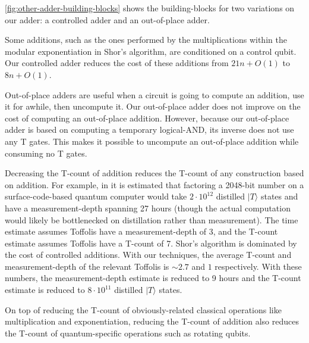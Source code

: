 \documentclass[twocolumn]{quantumarticle-customized}
\begin{document}
\autoref{fig:other-adder-building-blocks} shows the building-blocks for two variations on our adder: a controlled adder and an out-of-place adder.

Some additions, such as the ones performed by the multiplications within the modular exponentiation in Shor's algorithm, are conditioned on a control qubit.
Our controlled adder reduces the cost of these additions from $21n + O(1)$ \cite{Coreas2017} to $8n + O(1)$.

Out-of-place adders are useful when a circuit is going to compute an addition, use it for awhile, then uncompute it.
Our out-of-place adder does not improve on the cost of computing an out-of-place addition.
However, because our out-of-place adder is based on computing a temporary logical-AND, its inverse does not use any T gates.
This makes it possible to uncompute an out-of-place addition while consuming no T gates.

Decreasing the T-count of addition reduces the T-count of any construction based on addition.
For example, in \cite{Fowler2012} it is estimated that factoring a 2048-bit number on a surface-code-based quantum computer would take $2 \cdot 10^{12}$ distilled $|T\rangle$ states and have a measurement-depth spanning 27 hours (though the actual computation would likely be bottlenecked on distillation rather than measurement).
The time estimate assumes Toffolis have a measurement-depth of 3, and the T-count estimate assumes Toffolis have a T-count of 7.
Shor's algorithm is dominated by the cost of controlled additions.
With our techniques, the average T-count and measurement-depth of the relevant Toffolis is $\sim 2.7$ and $1$ respectively.
With these numbers, the measurement-depth estimate is reduced to 9 hours and the T-count estimate is reduced to $8 \cdot 10^{11}$ distilled $|T\rangle$ states.

On top of reducing the T-count of obviously-related classical operations like multiplication and exponentiation, reducing the T-count of addition also reduces the T-count of quantum-specific operations such as rotating qubits.
\end{document}
